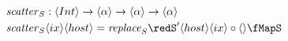 \documentclass[preview]{standalone}
\begin{document}
\begin{align*}%
  \mathit{scatter}_S &: \vect{Int} \rightarrow \vect{\alpha} \rightarrow \vect{\alpha} \rightarrow \vect{\alpha} \\
  \mathit{scatter}_S &\vect{ix} \vect{host} =  \mathit{replace}_S \redS' \vect{host} \vect{ix} \circ \vect{} \fMapS
\end{align*}
\end{document}
